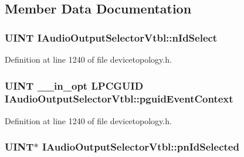 \subsection{Member Data Documentation}
\subsubsection[{\texorpdfstring{n\+Id\+Select}{nIdSelect}}]{ {\bf U\+I\+NT} I\+Audio\+Output\+Selector\+Vtbl\+::n\+Id\+Select}\hypertarget{struct_i_audio_output_selector_vtbl_a4960360ffa9125ee9207c46a181c8201}{}\label{struct_i_audio_output_selector_vtbl_a4960360ffa9125ee9207c46a181c8201}


Definition at line 1240 of file devicetopology.\+h.

\subsubsection[{\texorpdfstring{pguid\+Event\+Context}{pguidEventContext}}]{ {\bf U\+I\+NT} {\bf \+\_\+\+\_\+in\+\_\+opt} {\bf L\+P\+C\+G\+U\+ID} I\+Audio\+Output\+Selector\+Vtbl\+::pguid\+Event\+Context}\hypertarget{struct_i_audio_output_selector_vtbl_a498334cc5248ed0648e0341f89d1aa9e}{}\label{struct_i_audio_output_selector_vtbl_a498334cc5248ed0648e0341f89d1aa9e}


Definition at line 1240 of file devicetopology.\+h.

\subsubsection[{\texorpdfstring{pn\+Id\+Selected}{pnIdSelected}}]{ {\bf U\+I\+NT}$\ast$ I\+Audio\+Output\+Selector\+Vtbl\+::pn\+Id\+Selected}\hypertarget{struct_i_audio_output_selector_vtbl_aaed24f792c8d79402c398ad94e5c0ee2}{}\label{struct_i_audio_output_selector_vtbl_aaed24f792c8d79402c398ad94e5c0ee2}


